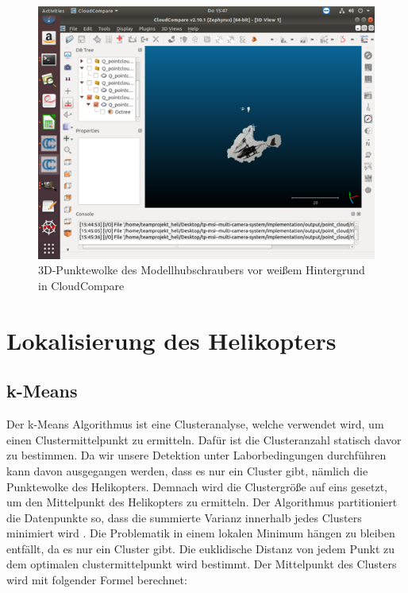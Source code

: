 \begin{figure}[H]
	\includegraphics[scale=1.0]{bilder/cloud_result}
	\caption[3D-Punktewolke des Modellhubschraubers vor weißem Hintergrund in CloudCompare]{3D-Punktewolke des Modellhubschraubers vor weißem Hintergrund in CloudCompare}
	\label{fig:cloudresult}%
\end{figure}

\section{Lokalisierung des Helikopters} 
\label{sec:lokalisierung}

\subsection{k-Means}
\label{subsec:kmeans}

Der k-Means Algorithmus ist eine Clusteranalyse, welche verwendet wird, um einen Clustermittelpunkt zu ermitteln. Dafür ist die Clusteranzahl statisch davor zu bestimmen. Da wir unsere Detektion unter Laborbedingungen durchführen kann davon ausgegangen werden, dass es nur ein Cluster gibt, nämlich die Punktewolke des Helikopters. Demnach wird die Clustergröße auf eins gesetzt, um den Mittelpunkt des Helikopters zu ermitteln. {Der Algorithmus partitioniert die Datenpunkte so, dass die summierte Varianz innerhalb jedes Clusters minimiert wird} \cite{KM}.\newline
\noindent Die Problematik in einem lokalen Minimum hängen zu bleiben entfällt, da es nur ein Cluster gibt. Die euklidische Distanz von jedem Punkt zu dem optimalen clustermittelpunkt wird bestimmt. Der Mittelpunkt des Clusters wird mit folgender Formel berechnet:

